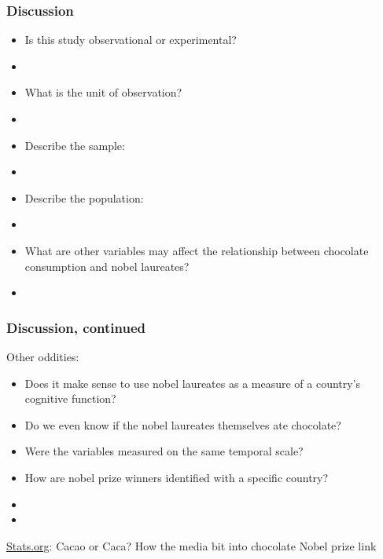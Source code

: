 \begin{frame}
\frametitle{Discussion}
\begin{itemize}
    \item
    Is this study observational or experimental?
    \item[]
    \item
    What is the unit of observation?
    \item[]
    \item
    Describe the sample:
    \item[]
    \item
    Describe the population:
    \item[]
    \item
    What are other variables may affect the relationship between chocolate consumption and nobel laureates?
    \item[]
\end{itemize}
\end{frame}

\begin{frame}
\frametitle{Discussion, continued}
 Other oddities:
    \begin{itemize}
    \item
    Does it make sense to use nobel laureates as a measure of a country's cognitive function?
    \item
    Do we even know if the nobel laureates themselves ate chocolate?
    \item
    Were the variables measured on the same temporal scale?
    \item
    How are nobel prize winners identified with a specific country?
    \item[]
    \item[]
    \end{itemize}
  \href{http://www.stats.org/stories/2012/Cacao_or_Caca_oct16_12.html}{Stats.org}: Cacao or Caca? How the media bit into chocolate Nobel prize link
\end{frame}

